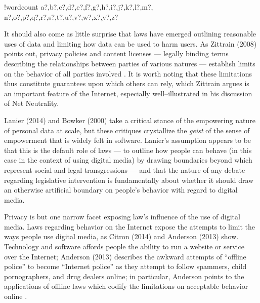 \documentclass[11pt]{article}
\newcounter{words}
\newenvironment{counted}{%
  \setcounter{words}{0}
  \SearchList!{wordcount}{\stepcounter{words}}
    {a?,b?,c?,d?,e?,f?,g?,h?,i?,j?,k?,l?,m?,
    n?,o?,p?,q?,r?,s?,t?,u?,v?,w?,x?,y?,z?}
  \UndoBoundary{'}
  \SearchOrder{p;}}{%
  \StopSearching}
\begin{document}
\begin{counted}

It should also come as little surprise that
laws have emerged outlining reasonable uses of data
and limiting how data can be used to harm users.
As Zittrain (2008) points out, privacy policies and content licenses
--- legally binding terms describing the relationships between parties of various natures ---
establish limits on the behavior of all parties involved
\cite{zittrain2008future}.
It is worth noting that these limitations thus constitute guarantees upon which others can rely,
which Zittrain argues is an important feature of the Internet,
especially well--illustrated in his discussion of Net Neutrality.

Lanier (2014) and Bowker (2000) take a critical stance of the empowering nature of personal data at scale,
but these critiques crystallize the \textit{geist}
of the sense of empowerment that is widely felt in software.
Lanier's assumption appears to be that this is the default role of laws
--- to outline how people can behave
(in this case in the context of using digital media)
by drawing boundaries beyond which represent social and legal transgressions ---
and that the nature of any debate regarding
legislative intervention is fundamentally about whether it should draw an otherwise
artificial boundary on people's behavior with regard to digital media.

Privacy is but one narrow facet exposing law's influence of the use of digital media.
Laws regarding behavior on the Internet expose the attempts to limit the ways people use digital media,
as Citron (2014) and Anderson (2013) show.
Technology and software affords people the ability to run a website or service over the Internet;
Anderson (2013) describes the awkward attempts of ``offline police'' to become ``Internet police''
as they attempt to follow spammers, child pornographers, and drug dealers online;
in particular,
Anderson points to the applications of offline laws
which codify the limitations on acceptable behavior online
\cite{anderson2013internet}.


\end{counted}
\end{document}

